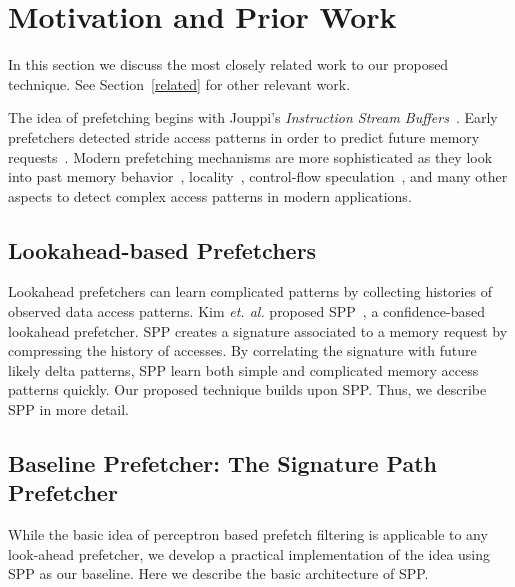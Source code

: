 \section{Motivation and Prior Work}
\label{Background}

In this section we discuss the most closely related work to our proposed
technique. See Section~\ref{related} for other relevant work.

The idea of prefetching begins with Jouppi's \textit{Instruction Stream
Buffers}~\cite{ISB}. Early prefetchers detected stride access patterns in order to
predict future memory requests~\cite{Smith,Baer,Stride}.  Modern prefetching
mechanisms are more sophisticated as they look into past memory
behavior~\cite{Address_Correlated,AMPM},
locality~\cite{Spatial_Pattern,SMS,Temporal_Instruction_Fetch,Off_Chip,STMS,SMS_JILP},
control-flow speculation~\cite{BFetch,MTBFetch}, and many other aspects to
detect complex access patterns in modern applications.

\subsection{Lookahead-based Prefetchers}

Lookahead prefetchers can learn complicated patterns by collecting histories of
observed data access patterns.
Kim {\em et. al.} proposed
SPP~\cite{SPP}, a confidence-based lookahead prefetcher. SPP creates a
signature associated to a memory request by compressing the history of
accesses. By correlating the signature with future likely delta patterns, SPP
learn both simple and complicated memory access patterns quickly. Our proposed
technique builds upon SPP. Thus, we describe SPP in more detail.

\subsection{Baseline Prefetcher: The Signature Path Prefetcher}
\label{Background-SPP}

While the basic idea of perceptron based prefetch filtering is applicable to
any look-ahead prefetcher, we develop a practical implementation of the idea
using SPP as our baseline.  Here we describe the basic architecture of SPP.

